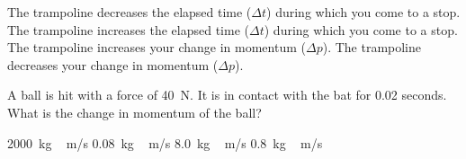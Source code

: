 \documentclass{exam}
\begin{document}
\begin{questions}
\begin{randomizechoices}
\choice The trampoline decreases the elapsed time ($\Delta t$) during which you come to a stop.
\correctchoice The trampoline increases the elapsed time ($\Delta t$) during which you come to a stop.
\choice The trampoline increases your change in momentum ($\Delta p$).
\choice The trampoline decreases your change in momentum ($\Delta p$).
\end{randomizechoices}



\question
A ball is hit with a force of \SI{40}{N}. It is in contact with the bat for 0.02 seconds. What is the change in momentum of the ball?

\begin{randomizechoices}
\choice \SI{2000}{kg\,m/s}
\choice \SI{0.08}{kg\,m/s}
\choice \SI{8.0}{kg\,m/s}
\correctchoice \SI{0.8}{kg\,m/s}
\end{randomizechoices}






\end{questions}
\end{document}
